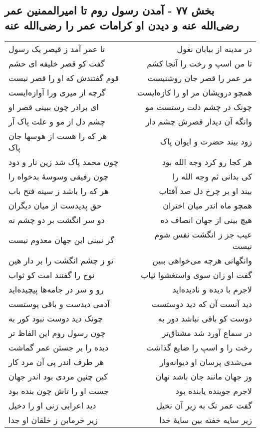 \begin{center}
\section*{بخش ۷۷ - آمدن رسول روم تا امیرالممنین عمر رضی‌الله عنه و دیدن او کرامات عمر را رضی‌الله عنه}
\label{sec:sh077}
\begin{longtable}{l p{0.5cm} r}
تا عمر آمد ز قیصر یک رسول
&&
در مدینه از بیابان نغول
\\
گفت کو قصر خلیفه ای حشم
&&
تا من اسپ و رخت را آنجا کشم
\\
قوم گفتندش که او را قصر نیست
&&
مر عمر را قصر جان روشنیست
\\
گرچه از میری ورا آوازه‌ایست
&&
همچو درویشان مر او را کازه‌ایست
\\
ای برادر چون ببینی قصر او
&&
چونک در چشم دلت رستست مو
\\
چشم دل از مو و علت پاک آر
&&
وانگه آن دیدار قصرش چشم دار
\\
هر که را هست از هوسها جان پاک
&&
زود بیند حضرت و ایوان پاک
\\
چون محمد پاک شد زین نار و دود
&&
هر کجا رو کرد وجه الله بود
\\
چون رفیقی وسوسهٔ بدخواه را
&&
کی بدانی ثم وجه الله را
\\
هر که را باشد ز سینه فتح باب
&&
بیند او بر چرخ دل صد آفتاب
\\
حق پدیدست از میان دیگران
&&
همچو ماه اندر میان اختران
\\
دو سر انگشت بر دو چشم نه
&&
هیچ بینی از جهان انصاف ده
\\
گر نبینی این جهان معدوم نیست
&&
عیب جز ز انگشت نفس شوم نیست
\\
تو ز چشم انگشت را بر دار هین
&&
وانگهانی هرچه می‌خواهی ببین
\\
نوح را گفتند امت کو ثواب
&&
گفت او زان سوی واستغشوا ثیاب
\\
رو و سر در جامه‌ها پیچیده‌اید
&&
لاجرم با دیده و نادیده‌اید
\\
آدمی دیدست و باقی پوستست
&&
دید آنست آن که دید دوستست
\\
چونک دید دوست نبود کور به
&&
دوست کو باقی نباشد دور به
\\
چون رسول روم این الفاظ تر
&&
در سماع آورد شد مشتاق‌تر
\\
دیده را بر جستن عمر گماشت
&&
رخت را و اسپ را ضایع گذاشت
\\
هر طرف اندر پی آن مرد کار
&&
می‌شدی پرسان او دیوانه‌وار
\\
کین چنین مردی بود اندر جهان
&&
وز جهان مانند جان باشد نهان
\\
جست او را تاش چون بنده بود
&&
لاجرم جوینده یابنده بود
\\
دید اعرابی زنی او را دخیل
&&
گفت عمر نک به زیر آن نخیل
\\
زیر خرمابن ز خلقان او جدا
&&
زیر سایه خفته بین سایهٔ خدا
\\
\end{longtable}
\end{center}
